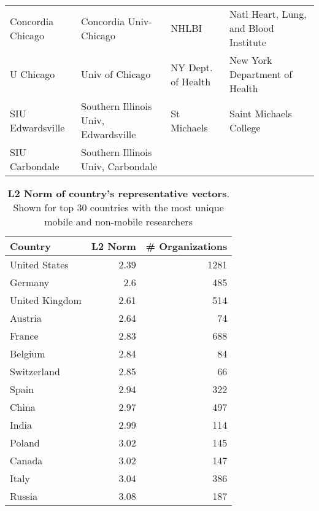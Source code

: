 \documentclass[12pt]{article} %
\begin{document}
\begin{table}[ht]
\begin{adjustwidth}{-2cm}{}
\begin{tabular}{llll}
  Concordia Chicago & Concordia Univ-Chicago & NHLBI & Natl Heart, Lung, and Blood Institute \\
  U Chicago & Univ of Chicago & NY Dept. of Health & New York Department of Health \\
  SIU Edwardsville & Southern Illinois Univ, Edwardsville & St Michaels & Saint Michaels College \\
  SIU Carbondale & Southern Illinois Univ, Carbondale &  &  \\
   \hline
\end{tabular}
\endgroup
\end{adjustwidth}
\end{table}


\newpage

\begin{table}[]
\centering
\caption{\textbf{L2 Norm of country's representative vectors}.
			 Shown for top 30 countries with the most unique mobile and non-mobile researchers}
\label{table:supp:norm}
\begin{tabular}{lrr}
\textbf{Country} & \textbf{L2 Norm} & \textbf{\# Organizations} \\ \hline
United States    & 2.39             & 1281                      \\
Germany          & 2.6              & 485                       \\
United Kingdom   & 2.61             & 514                       \\
Austria          & 2.64             & 74                        \\
France           & 2.83             & 688                       \\
Belgium          & 2.84             & 84                        \\
Switzerland      & 2.85             & 66                        \\
Spain            & 2.94             & 322                       \\
China            & 2.97             & 497                       \\
India            & 2.99             & 114                       \\
Poland           & 3.02             & 145                       \\
Canada           & 3.02             & 147                       \\
Italy            & 3.04             & 386                       \\
Russia           & 3.08             & 187                       \\

\end{tabular}
\end{table}
\end{document}
